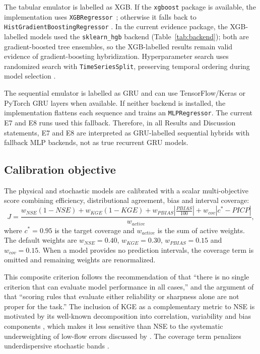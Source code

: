 \documentclass[a4paper,fleqn]{cas-sc}
\begin{document}
The tabular emulator is labelled as XGB. If the \texttt{xgboost}
package is available, the implementation uses
\texttt{XGBRegressor}~\citep{chen2016xgboost}; otherwise it falls
back to \texttt{HistGradientBoostingRegressor}
\citep{friedman2001gbm}. In the current evidence package, the
XGB-labelled models used the \texttt{sklearn\_hgb} backend
(Table~\ref{tab:backend}); both are gradient-boosted tree ensembles,
so the XGB-labelled results remain valid evidence of gradient-boosting
hybridization. Hyperparameter search uses randomized search with
\texttt{TimeSeriesSplit}, preserving temporal ordering during model
selection \citep{chen2013}.

The sequential emulator is labelled as GRU \citep{cho2014gru} and can
use TensorFlow/Keras or PyTorch GRU layers when available. If neither
backend is installed, the implementation flattens each sequence and
trains an \texttt{MLPRegressor}. The current E7 and E8 runs used this
fallback. Therefore, in all Results and Discussion statements, E7 and
E8 are interpreted as GRU-labelled sequential hybrids with fallback
MLP backends, not as true recurrent GRU models.

\subsection{Calibration objective}\label{subsec:calibration}

The physical and stochastic models are calibrated with a scalar
multi-objective score combining efficiency, distributional agreement,
bias and interval coverage:
\begin{equation}
J = \frac{w_{NSE}(1-NSE) + w_{KGE}(1-KGE)
  + w_{PBIAS}\left|\frac{PBIAS}{100}\right|
  + w_{cov}|c^*-PICP|}{w_{active}},
\label{eq:objective}
\end{equation}
where $c^*=0.95$ is the target coverage and $w_{active}$ is the sum
of active weights. The default weights are $w_{NSE}=0.40$,
$w_{KGE}=0.30$, $w_{PBIAS}=0.15$ and $w_{cov}=0.15$. When a model
provides no prediction intervals, the coverage term is omitted and
remaining weights are renormalized.

This composite criterion follows the recommendation of
\citet{pushpalatha2012} that ``there is no single criterion that can
evaluate model performance in all cases,'' and the argument of
\citet{papacharalampous2022} that ``scoring rules that evaluate either
reliability or sharpness alone are not proper for the task.'' The
inclusion of KGE as a complementary metric to NSE is motivated by its
well-known decomposition into correlation, variability and bias
components \citep{gupta2009kge}, which makes it less sensitive than NSE
to the systematic underweighting of low-flow errors discussed by
\citet{pushpalatha2012}. The coverage term penalizes underdispersive
stochastic bands \citep{franz2011,abaza2017}.
\end{document}
